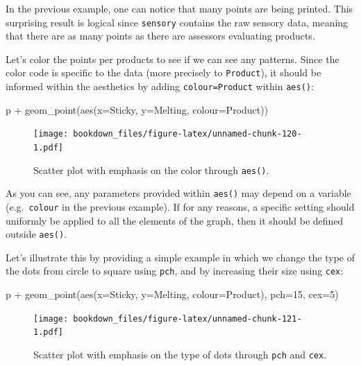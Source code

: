 \documentclass[
]{krantz}
\makeatletter
\newenvironment{Shaded}{\begin{snugshade}}{\end{snugshade}}
\newcommand{\AttributeTok}[1]{\textcolor[rgb]{0.61,0.61,0.61}{#1}}
\newcommand{\DecValTok}[1]{\textcolor[rgb]{0.06,0.06,0.06}{#1}}
\newcommand{\FunctionTok}[1]{\textcolor[rgb]{0,0,0}{#1}}
\newcommand{\NormalTok}[1]{#1}
\newcommand{\SpecialCharTok}[1]{\textcolor[rgb]{0,0,0}{#1}}
\newenvironment{kframe}{%
\medskip{}
\setlength{\fboxsep}{.8em}
 \def\at@end@of@kframe{}%
 \ifinner\ifhmode%
  \def\at@end@of@kframe{\end{minipage}}%
  \begin{minipage}{\columnwidth}%
 \fi\fi%
 \def\FrameCommand##1{\hskip\@totalleftmargin \hskip-\fboxsep
 \colorbox{shadecolor}{##1}\hskip-\fboxsep
     \hskip-\linewidth \hskip-\@totalleftmargin \hskip\columnwidth}%
 \MakeFramed {\advance\hsize-\width
   \@totalleftmargin\z@ \linewidth\hsize
   \@setminipage}}%
 {\par\unskip\endMakeFramed%
 \at@end@of@kframe}
\renewenvironment{Shaded}{\begin{kframe}}{\end{kframe}}
\makeatother
\begin{document}
In the previous example, one can notice that many points are being printed. This surprising result is logical since \texttt{sensory} contains the raw sensory data, meaning that there are as many points as there are assessors evaluating products.

Let's color the points per products to see if we can see any patterns. Since the color code is specific to the data (more precisely to \texttt{Product}), it should be informed within the aesthetics by adding \texttt{colour=Product} within \texttt{aes()}:

\begin{Shaded}
\begin{Highlighting}[]
\NormalTok{p }\SpecialCharTok{+} \FunctionTok{geom\_point}\NormalTok{(}\FunctionTok{aes}\NormalTok{(}\AttributeTok{x=}\NormalTok{Sticky, }\AttributeTok{y=}\NormalTok{Melting, }\AttributeTok{colour=}\NormalTok{Product))}
\end{Highlighting}
\end{Shaded}

\begin{figure}
\centering
\texttt{[image: bookdown\_files/figure-latex/unnamed-chunk-120-1.pdf]}
\caption{\label{fig:unnamed-chunk-120}Scatter plot with emphasis on the color through \texttt{aes()}.}
\end{figure}

As you can see, any parameters provided within \texttt{aes()} may depend on a variable (e.g.~\texttt{colour} in the previous example).
If for any reasons, a specific setting should uniformly be applied to all the elements of the graph, then it should be defined outside \texttt{aes()}.

Let's illustrate this by providing a simple example in which we change the type of the dots from circle to square using \texttt{pch}, and by increasing their size using \texttt{cex}:

\begin{Shaded}
\begin{Highlighting}[]
\NormalTok{p }\SpecialCharTok{+} \FunctionTok{geom\_point}\NormalTok{(}\FunctionTok{aes}\NormalTok{(}\AttributeTok{x=}\NormalTok{Sticky, }\AttributeTok{y=}\NormalTok{Melting, }\AttributeTok{colour=}\NormalTok{Product), }\AttributeTok{pch=}\DecValTok{15}\NormalTok{, }\AttributeTok{cex=}\DecValTok{5}\NormalTok{)}
\end{Highlighting}
\end{Shaded}

\begin{figure}
\centering
\texttt{[image: bookdown\_files/figure-latex/unnamed-chunk-121-1.pdf]}
\caption{\label{fig:unnamed-chunk-121}Scatter plot with emphasis on the type of dots through \texttt{pch} and \texttt{cex}.}
\end{figure}
\end{document}
